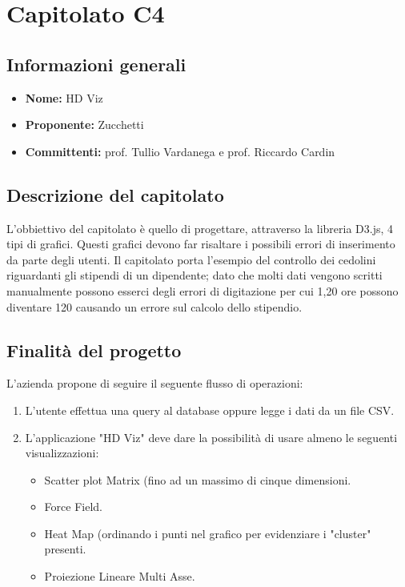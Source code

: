 \section{Capitolato C4}

\subsection{Informazioni generali}
\begin{itemize}
\item \textbf{Nome:} HD Viz
\item \textbf{Proponente:} Zucchetti
\item \textbf{Committenti:} prof. Tullio Vardanega e prof. Riccardo Cardin
\end{itemize}

\subsection{Descrizione del capitolato}
L'obbiettivo del capitolato è quello di progettare, attraverso la libreria D3.js, 4 tipi di grafici. Questi grafici devono far risaltare i possibili errori di inserimento da parte degli utenti.
Il capitolato porta l'esempio del controllo dei cedolini riguardanti gli stipendi di un dipendente; dato che molti dati vengono scritti manualmente possono esserci degli errori di digitazione per cui 1,20 ore possono diventare 120 causando un errore sul calcolo dello stipendio.

\subsection{Finalità del progetto}
L'azienda propone di seguire il seguente flusso di operazioni:
\begin{enumerate}
\item L'utente effettua una query al database oppure legge i dati da un file CSV.
\item L'applicazione "HD Viz" deve dare la possibilità di usare almeno le seguenti visualizzazioni:
	\begin{itemize}
	\item Scatter plot Matrix (fino ad un massimo di cinque dimensioni.
	\item Force Field.
	\item Heat Map (ordinando i punti nel grafico per evidenziare i "cluster" presenti.
	\item Proiezione Lineare Multi Asse.
	\end{itemize}
\end{enumerate}

